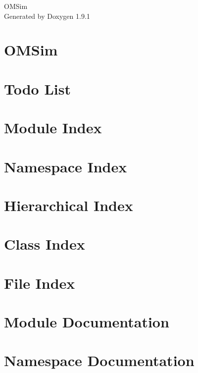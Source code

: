 \let\mypdfximage\pdfximage\def\pdfximage{\immediate\mypdfximage}\documentclass[twoside]{book}
\newcommand{\+}{\discretionary{\mbox{\scriptsize$\hookleftarrow$}}{}{}}
\newcommand{\clearemptydoublepage}{%
  \newpage{\pagestyle{empty}\cleardoublepage}%
}
\begin{document}
\raggedbottom

\hypersetup{pageanchor=false,
             bookmarksnumbered=true,
             pdfencoding=unicode
            }
\begin{titlepage}
\vspace*{7cm}
\begin{center}%
{\Large OMSim }\\
\vspace*{1cm}
{\large Generated by Doxygen 1.9.1}\\
\end{center}
\end{titlepage}
\clearemptydoublepage
{}
\tableofcontents
\clearemptydoublepage
{}
\hypersetup{pageanchor=true}

\chapter{OMSim}
\label{index}\hypertarget{index}{}
\chapter{Todo List}
\label{todo}

\chapter{Module Index}

\chapter{Namespace Index}

\chapter{Hierarchical Index}

\chapter{Class Index}

\chapter{File Index}

\chapter{Module Documentation}


\chapter{Namespace Documentation}



\end{document}
